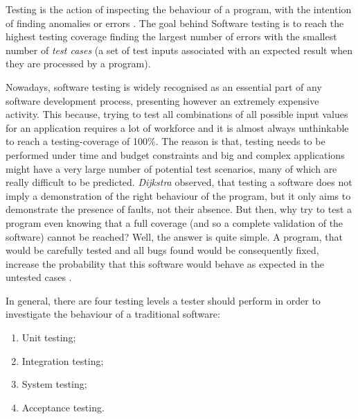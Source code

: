 Testing is the action of inspecting the behaviour of a program, with the intention of finding anomalies or errors \cite{testing}.
The goal behind Software testing is to reach the highest testing coverage finding the largest number of errors with the smallest number of \textit{test cases} (a set of test inputs associated with an expected result when they are processed by a program).

Nowadays, software testing is widely recognised as an essential part of any software development process, presenting however an extremely expensive activity. This because, trying to test all combinations of all possible input values for an application \cite{glinz} requires a lot of workforce and it is almost always unthinkable to reach a testing-coverage of 100\%. The reason is that, testing needs to be performed under time and budget constraints \cite{grano} and big and complex applications might have a very large number of potential test scenarios, many of which are really difficult to be predicted.  \textit{Dijkstra} \cite{dijkstra} observed, that testing a software does not imply a demonstration of the right behaviour of the program, but it only aims to demonstrate the presence of faults, not their absence. But then, why try to test a program even knowing that a full coverage (and so a complete validation of the software) cannot be reached? Well, the answer is quite simple. 
A program, that would be carefully tested and all bugs found would be consequently fixed, increase the probability that this software would behave as expected in the untested cases \cite{glinz}. 

In general, there are four testing levels a tester should perform in order to investigate the behaviour of a traditional software: 
\begin{enumerate}
\item Unit testing; 
\item Integration testing; 
\item System testing; 
\item Acceptance testing.
\end{enumerate}

